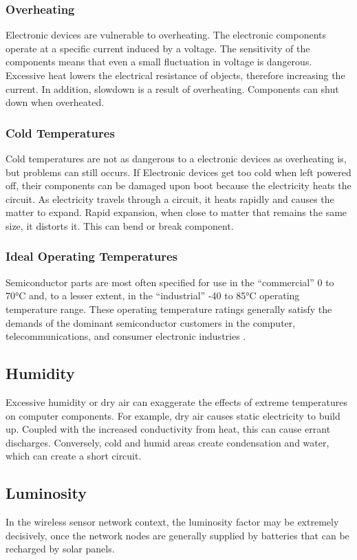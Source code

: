 \subsubsection{Overheating}
Electronic devices are vulnerable to overheating. The electronic components operate at a specific current induced by a voltage. The sensitivity of the components means that even a small fluctuation in voltage is dangerous. Excessive heat lowers the electrical resistance of objects, therefore increasing the current. In addition, slowdown is a result of overheating. Components can shut down when overheated.

\subsubsection{Cold Temperatures}
Cold temperatures are not as dangerous to a electronic devices as overheating is, but problems can still occurs. If Electronic devices get too cold when left powered off, their components can be damaged upon boot because the electricity heats the circuit. As electricity travels through a circuit, it heats rapidly and causes the matter to expand. Rapid expansion, when close to matter that remains the same size, it distorts it. This can bend or break component.

\subsubsection{Ideal Operating Temperatures}
Semiconductor parts are most often specified for use in the “commercial” 0 to 70°C and, to a lesser extent, in the “industrial” -40 to 85°C operating temperature range. These operating temperature ratings generally satisfy the demands of the dominant semiconductor customers in the computer, telecommunications, and consumer electronic industries \cite{Mishra2004}.

\subsection{Humidity}
Excessive humidity or dry air can exaggerate the effects of extreme temperatures on computer components. For example, dry air causes static electricity to build up. Coupled with the increased conductivity from heat, this can cause errant discharges. Conversely, cold and humid areas create condensation and water, which can create a short circuit.

\subsection{Luminosity}
In the wireless sensor network context, the luminosity factor may be extremely decisively, once the network nodes are generally supplied by batteries that can be recharged by solar panels.

